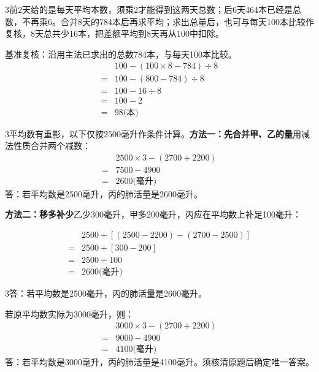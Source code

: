 \documentclass[multi=snippet,border={5bp 20bp 5bp 5bp}]{standalone}
\newenvironment{snippet}[3]{\begin{minipage}{#1bp}\color{answerred}\fontsize{#2}{#3}\selectfont\raggedright}{\end{minipage}}
\begin{document}
\begin{snippet}{505}{11.5}{14}\begin{multicols}{3}\raggedcolumns 前2天给的是每天平均本数，须乘2才能得到这两天总数；后6天464本已经是总数，不再乘6。合并8天的784本后再求平均；求出总量后，也可与每天100本比较作复核，8天总共少16本，把差额平均到8天再从100中扣除。\par 基准复核：沿用主法已求出的总数784本，与每天100本比较。\[\begin{aligned}&100-(100\times8-784)\div8\\={}&100-(800-784)\div8\\={}&100-16\div8\\={}&100-2\\={}&98\text{(本)}\end{aligned}\]\end{multicols}\end{snippet}
\begin{snippet}{505}{11.5}{14}\begin{multicols}{3}\raggedcolumns 平均数有重影，以下仅按2500毫升作条件计算。\textbf{方法一：先合并甲、乙的量}用减法性质合并两个减数：\[\begin{aligned}&2500\times3-(2700+2200)\\={}&7500-4900\\={}&2600\text{(毫升)}\end{aligned}\]答：若平均数是2500毫升，丙的肺活量是2600毫升。\par\textbf{方法二：移多补少}乙少300毫升，甲多200毫升，丙应在平均数上补足100毫升：\end{multicols}\[\begin{aligned}&2500+[(2500-2200)-(2700-2500)]\\={}&2500+[300-200]\\={}&2500+100\\={}&2600\text{(毫升)}\end{aligned}\]\begin{multicols}{3}\raggedcolumns 答：若平均数是2500毫升，丙的肺活量是2600毫升。\par 若原平均数实际为3000毫升，则：\[\begin{aligned}&3000\times3-(2700+2200)\\={}&9000-4900\\={}&4100\text{(毫升)}\end{aligned}\]答：若平均数是3000毫升，丙的肺活量是4100毫升。须核清原题后确定唯一答案。\end{multicols}\end{snippet}
\end{document}
